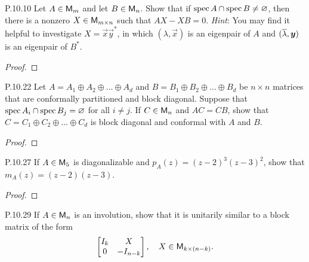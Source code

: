 \documentclass{../homework}
\date{Tuesday 4/9}
\author{}
\begin{document}
\begin{problems}
\item[P.10.10] Let \(A \in \mathsf{M}_m\) and let \(B \in \mathsf{M}_n\).  Show that
  if \(\operatorname{spec} A \cap \operatorname{spec} B \ne \varnothing\), then there is a nonzero
  \(X \in \mathsf{M}_{m \times n}\) such that \(AX - XB = 0\).  \textit{Hint}:
  You may find it helpful to investigate \(X = \vec x \vec y^*\), in
  which \((\lambda, \vec x)\) is an eigenpair of \(A\) and
  \((\conj\lambda, \vec y)\) is an eigenpair of \(B^*\).

  \begin{solution}
    \begin{proof}

    \end{proof}
  \end{solution}

\item[P.10.22] Let \(A = A_1 \oplus A_2 \oplus \dots \oplus A_d\) and
  \(B = B_1 \oplus B_2 \oplus \dots \oplus B_d\) be \(n \times n\)
  matrices that are conformally partitioned and block diagonal.
  Suppose that \(\operatorname{spec} A_i \cap \operatorname{spec} B_j = \varnothing\) for all
  \(i \ne j\).  If \(C \in \mathsf{M}_n\) and \(AC = CB\), show that
  \(C = C_1 \oplus C_2 \oplus \dots \oplus C_d\) is block diagonal and
  conformal with \(A\) and \(B\).

  \begin{solution}
    \begin{proof}

    \end{proof}
  \end{solution}

\item[P.10.27] If \(A \in \mathsf{M}_5\) is diagonalizable and
  \(p_A(z) = (z-2)^3 (z-3)^2\), show that \(m_A(z) = (z-2)(z-3)\).

  \begin{solution}
    \begin{proof}

    \end{proof}
  \end{solution}

\item[P.10.29] If \(A \in \mathsf{M}_n\) is an involution, show that it is
  unitarily similar to a block matrix of the form
  \[
    \begin{bmatrix}
      I_k & X \\ 0 & -I_{n-k}
    \end{bmatrix},
    \quad X \in \mathsf{M}_{k \times (n-k)}.
  \]


\end{problems}
\end{document}
